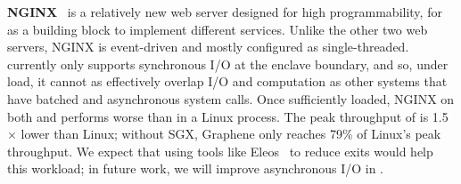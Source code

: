{\bf NGINX}~\cite{nginx} is a relatively new web server designed for high programmability, for as a building block to implement different services.
Unlike the other two web servers, NGINX is event-driven and mostly configured as single-threaded.
\graphenesgx{} currently only supports synchronous I/O at the enclave boundary,
and so, under load, it cannot as effectively overlap I/O and computation
as other systems that have batched and asynchronous system calls.
Once sufficiently loaded, NGINX on both \graphene{} and \graphenesgx{} 
performs worse than in a  Linux process. %
The peak throughput of \graphenesgx{} is 1.5$\times$ lower than Linux;
without SGX, Graphene only reaches 79\% of Linux's peak throughput.
We expect that using tools like Eleos~\cite{orenbach17eleos} to reduce exits
would help this workload; in future work, we will improve
asynchronous I/O in \graphenesgx{}.


